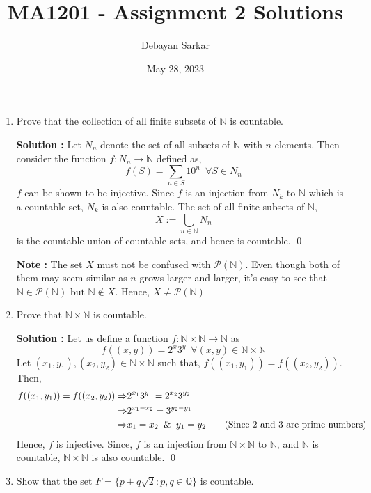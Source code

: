 \documentclass[10pt]{article}
\title{MA1201 - Assignment 2 Solutions}
\author{Debayan Sarkar}
\date{May 28, 2023}
\newcommand{\nn}{\mathbb{N}}
\newcommand{\q}{\mathbb{Q}}
\newcommand{\p}{\mathcal{P}}
\begin{document}
\maketitle
\begin{enumerate}
    \item Prove that the collection of all finite subsets of $\nn$ is countable.

	    \textbf{Solution : }Let $N_n$ denote the set of all subsets of $\nn$ with $n$ elements.
	    Then consider the function $f : N_n \to \nn$ defined as, 
	    $$f(S) = \sum_{n\in S} 10^{n} \,\,\, \forall S \in N_n$$
	    $f$ can be shown to be injective. Since $f$ is an injection from $N_k$ to $\nn$ which is a countable set, 
	    $N_k$ is also countable. The set of all finite subsets of $\nn$,
	    $$X := \bigcup_{n \in \nn} N_n$$ is the countable union of countable sets, and hence is countable. \qed

	    \textbf{Note : }The set $X$ must not be confused with $\p(\nn)$. Even though both of them may seem similar as $n$ grows larger and larger, 
	    it's easy to see that $\nn \in \p(\nn) \text{ but } \nn \notin X$. Hence, $X \neq \p(\nn)$
    \item Prove that $\nn \times \nn$ is countable.

    \textbf{Solution : }Let us define a function $f : \nn \times \nn \to \nn$ as $$f((x, y)) = 2^x 3^y \,\,\, \forall (x, y) \in \nn \times \nn$$ Let $(x_1, y_1) , (x_2, y_2) \in \nn \times \nn$ such that, $f((x_1, y_1)) = f((x_2, y_2))$. Then, 
    \begin{align*}
        f((x_1, y_1)) = f((x_2, y_2))
        \Rightarrow &2^{x_1}3^{y_1} = 2^{x_2}3^{y_2} \\
        \Rightarrow &2^{x_1 - x_2} = 3^{y_2 - y_1}\\
        \Rightarrow &x_1 = x_2 \And y_1 = y_2 \tag{Since 2 and 3 are prime numbers}
    \end{align*}
    Hence, $f$ is injective. Since, $f$ is an injection from $\nn \times \nn$ to $\nn$, and $\nn$ is countable, $\nn \times \nn$ is also countable. \qed
    \item Show that the set $F = \{ p + q\sqrt{2}: p,q \in \q \}$ is countable.
    

\end{enumerate}
\end{document}
